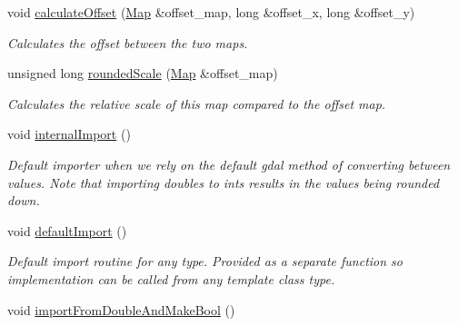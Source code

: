 \begin{DoxyCompactItemize}
\item 
void \hyperlink{class_map_a200701b23560dd38238801522b234e78}{calculate\+Offset} (\hyperlink{class_map}{Map} \&offset\+\_\+map, long \&offset\+\_\+x, long \&offset\+\_\+y)
\begin{DoxyCompactList}\small\item\em Calculates the offset between the two maps. \end{DoxyCompactList}\item 
unsigned long \hyperlink{class_map_a9862291ea99fe1718d758213b3687bd8}{rounded\+Scale} (\hyperlink{class_map}{Map} \&offset\+\_\+map)
\begin{DoxyCompactList}\small\item\em Calculates the relative scale of this map compared to the offset map. \end{DoxyCompactList}\item 
void \hyperlink{class_map_a0c17360ca7fa935d59f2169fd0007630}{internal\+Import} ()
\begin{DoxyCompactList}\small\item\em Default importer when we rely on the default gdal method of converting between values. Note that importing doubles to ints results in the values being rounded down. \end{DoxyCompactList}\item 
void \hyperlink{class_map_a414e6bc9305ab830836cf817cb4a0d60}{default\+Import} ()\hypertarget{class_map_a414e6bc9305ab830836cf817cb4a0d60}{}\label{class_map_a414e6bc9305ab830836cf817cb4a0d60}

\begin{DoxyCompactList}\small\item\em Default import routine for any type. Provided as a separate function so implementation can be called from any template class type. \end{DoxyCompactList}\item 
void \hyperlink{class_map_aaefe833ab35a68ce54e7eec996c48971}{import\+From\+Double\+And\+Make\+Bool} ()\hypertarget{class_map_aaefe833ab35a68ce54e7eec996c48971}{}\label{class_map_aaefe833ab35a68ce54e7eec996c48971}


\end{DoxyCompactItemize}
